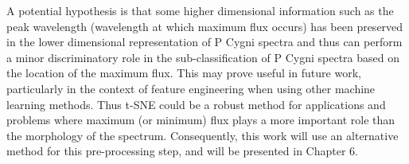 A potential hypothesis is that some higher dimensional information such as the peak wavelength (wavelength at which maximum flux occurs) has been preserved in the lower dimensional representation of P Cygni spectra and thus can perform a minor discriminatory role in the sub-classification of P Cygni spectra based on the location of the maximum flux. This may prove useful in future work, particularly in the context of feature engineering when using other machine learning methods. Thus t-SNE could be a robust method for applications and problems where maximum (or minimum) flux plays a more important role than the morphology of the spectrum. Consequently, this work will use an alternative method for this pre-processing step, and will be presented in Chapter 6.